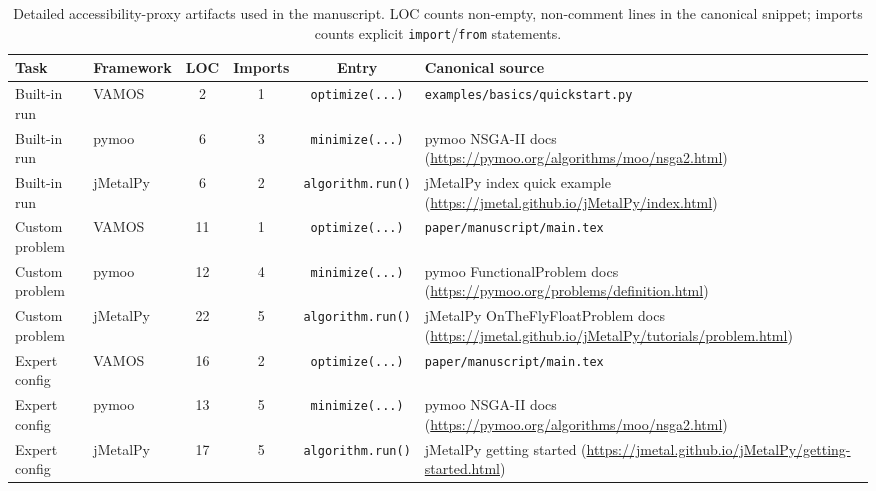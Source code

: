 \begin{table}[htbp]
\centering
\scriptsize
\setlength{\tabcolsep}{4pt}
\caption{Detailed accessibility-proxy artifacts used in the manuscript. LOC counts non-empty, non-comment lines in the canonical snippet; imports counts explicit \texttt{import}/\texttt{from} statements.}
\label{tab:accessibility_proxy_details}
\begin{tabular}{@{}llcccp{}@{}}
\toprule
\textbf{Task} & \textbf{Framework} & \textbf{LOC} & \textbf{Imports} & \textbf{Entry} & \textbf{Canonical source} \\
\midrule
Built-in run & VAMOS & 2 & 1 & \texttt{optimize(...)} & \texttt{examples/basics/quickstart.py} \\
Built-in run & pymoo & 6 & 3 & \texttt{minimize(...)} & pymoo NSGA-II docs (\url{https://pymoo.org/algorithms/moo/nsga2.html}) \\
Built-in run & jMetalPy & 6 & 2 & \texttt{algorithm.run()} & jMetalPy index quick example (\url{https://jmetal.github.io/jMetalPy/index.html}) \\
\midrule
Custom problem & VAMOS & 11 & 1 & \texttt{optimize(...)} & \texttt{paper/manuscript/main.tex} \\
Custom problem & pymoo & 12 & 4 & \texttt{minimize(...)} & pymoo FunctionalProblem docs (\url{https://pymoo.org/problems/definition.html}) \\
Custom problem & jMetalPy & 22 & 5 & \texttt{algorithm.run()} & jMetalPy OnTheFlyFloatProblem docs (\url{https://jmetal.github.io/jMetalPy/tutorials/problem.html}) \\
\midrule
Expert config & VAMOS & 16 & 2 & \texttt{optimize(...)} & \texttt{paper/manuscript/main.tex} \\
Expert config & pymoo & 13 & 5 & \texttt{minimize(...)} & pymoo NSGA-II docs (\url{https://pymoo.org/algorithms/moo/nsga2.html}) \\
Expert config & jMetalPy & 17 & 5 & \texttt{algorithm.run()} & jMetalPy getting started (\url{https://jmetal.github.io/jMetalPy/getting-started.html}) \\
\bottomrule
\end{tabular}
\end{table}

